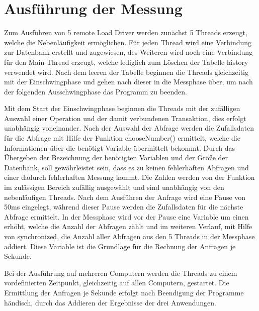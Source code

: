 \section{Ausführung der Messung}

Zum Ausführen von 5 remote Load Driver werden zunächst 5 Threads erzeugt, welche die Nebenläufigkeit 
ermöglichen. Für jeden Thread wird eine Verbindung zur Datenbank erstellt und zugewiesen, des 
Weiteren wird noch eine Verbindung für den Main-Thread erzeugt, welche lediglich zum Löschen der 
Tabelle history verwendet wird. Nach dem leeren der Tabelle beginnen die Threads gleichzeitig mit 
der Einschwingphase und gehen nach dieser in die Messphase über, um nach der folgenden 
Ausschwingphase das Programm zu beenden.

Mit dem Start der Einschwingphase beginnen die Threads mit der zufälligen Auswahl einer Operation 
und der damit verbundenen Transaktion, dies erfolgt unabhängig voneinander. Nach der Auswahl der 
Abfrage werden die Zufallsdaten für die Abfrage mit Hilfe der Funktion chooseNumber() ermittelt, 
welche die Informationen über die benötigt Variable übermittelt bekommt. Durch das Übergeben der 
Bezeichnung der benötigten Variablen und der Größe der Datenbank, soll gewährleistet sein, dass es 
zu keinen fehlerhaften Abfragen und einer dadurch fehlerhaften Messung kommt. Die Zahlen werden von 
der Funktion im zulässigen Bereich zufällig ausgewählt und sind unabhängig von den nebenläufigen 
Threads. Nach dem Ausführen der Anfrage wird eine Pause von 50ms eingelegt, während dieser Pause 
werden die Zufallsdaten für die nächste Abfrage ermittelt. In der Messphase wird vor der Pause eine 
Variable um einen erhöht, welche die Anzahl der Abfragen zählt und im weiteren Verlauf, mit Hilfe 
von synchronized, die Anzahl aller Abfragen aus den 5 Threads in der Messphase addiert. Diese 
Variable ist die Grundlage für die Rechnung der Anfragen je Sekunde.

Bei der Ausführung auf mehreren Computern werden die Threads zu einem vordefinierten Zeitpunkt, 
gleichzeitig auf allen Computern, gestartet. Die Ermittlung der Anfragen je Sekunde erfolgt nach 
Beendigung der Programme händisch, durch das Addieren der Ergebnisse der drei Anwendungen.


\clearpage
